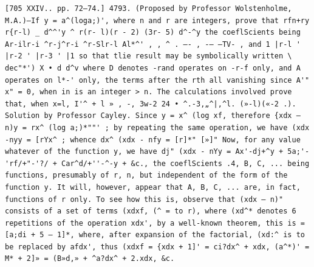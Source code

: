 \documentclass[11pt,a4paper]{book}
\begin{document}
\newpage
\setcounter{page}{590}
\begin{verbatim}
[705 XXIV.. pp. 72—74.] 4793. (Proposed by Professor Wolstenholme, M.A.)—If y = a^(loga;)', where n and r are integers, prove that rfn+ry r{r-l) _ d^^'y ^ r(r- l)(r - 2) (3r- 5) d^-^y the coeflScients being Ar-ilr-i ^r-j^r-i ^r-Slr-l Al*^' , , ^ . —- , -— —TV- , and 1 |r-l ' |r-2 ' |r-3 ' |1 so that tlie result may be symbolically written \ dec"*') X • d d^v where D denotes -rand operates on -r-f only, and A operates on l*-' only, the terms after the rth all vanishing since A'" x" = 0, when in is an integer > n. The calculations involved prove that, when x=l, I'^ + l » , -, 3w-2 24 • ^.-3,„^|,^l. (»-l)(«-2 .). Solution by Professor Cayley. Since y = x^ (log xf, therefore {xdx — n)y = rx^ (log a;)*""' ; by repeating the same operation, we have (xdx -nyy = [rYx^ ; whence dx^ (xdx - nfy = [r]*" [»]" Now, for any value whatever of the function y, we have dj" (xdx - nYy = Ax'-dj+^y + 5a;'-'rf/+"-'?/ + Car^d/+''-^-y + &c., the coeflScients .4, B, C, ... being functions, presumably of r, n, but independent of the form of the function y. It will, however, appear that A, B, C, ... are, in fact, functions of r only. To see how this is, observe that (xdx — n)" consists of a set of terms (xdxf, (^ = to r), where (xd^* denotes 6 repetitions of the operation xdx', by a well-known theorem, this is =[a;di + 5 — 1]*, where, after expansion of the factorial, (xd:^ is to be replaced by afdx', thus (xdxf = {xdx + 1]' = ci?dx^ + xdx, (a^*)' = M* + 2]» = (B»d,» + ^a?dx^ + 2.xdx, &c. 
\end{verbatim}
\end{document}
